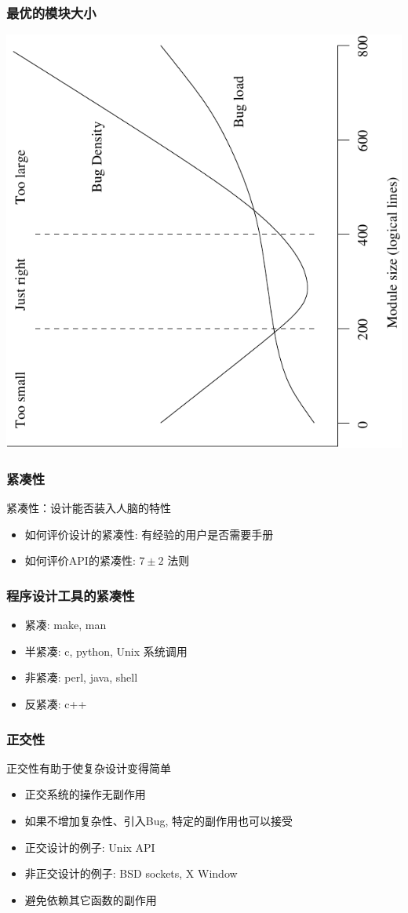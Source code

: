 \documentclass[compress]{beamer}
\begin{document}
\begin{frame}
  \frametitle{最优的模块大小}
  \centering\includegraphics[angle=-90,width=0.7\hsize]{modulesize.pdf}\\[5mm]
\end{frame}

\begin{frame}
\frametitle{紧凑性}
\begin{block}{紧凑性：设计能否装入人脑的特性}
\begin{itemize}
\item 如何评价设计的紧凑性: 有经验的用户是否需要手册
\item 如何评价API的紧凑性: \alert{$7\pm2$} 法则
\end{itemize}
\end{block}
\end{frame}

\begin{frame}
\frametitle{程序设计工具的紧凑性}
\begin{itemize}
  \item 紧凑: make, man
  \item 半紧凑: c, python, Unix 系统调用
  \item 非紧凑: perl, java, shell
  \item 反紧凑: c++
\end{itemize}
\end{frame}

\begin{frame}
\frametitle{正交性}
\begin{block}{正交性有助于使复杂设计变得简单}
\begin{itemize}
	\item 正交系统的操作无副作用
    \item 如果不增加复杂性、引入Bug, 特定的副作用也可以接受
	\item 正交设计的例子: Unix API
    \item 非正交设计的例子: BSD sockets, X Window
	\item 避免依赖其它函数的副作用
    \end{itemize}
\end{block}
\end{frame}
\end{document}
